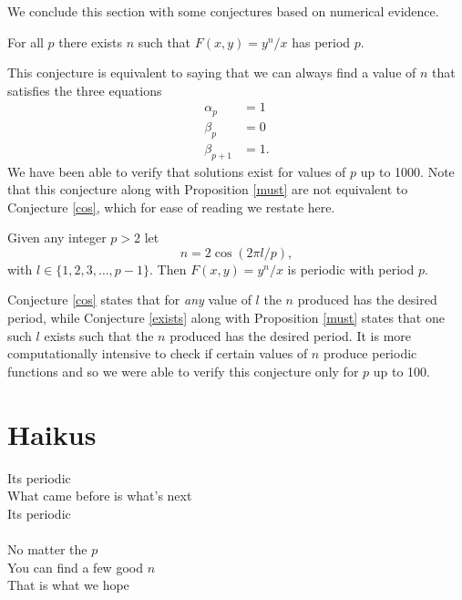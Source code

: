 \documentclass[12pt]{article}
\begin{document}
We conclude this section with some conjectures based on numerical evidence. 

\begin{conjecture}
\label{exists}
 For all $p$ there exists $n$ such that $F(x,y)=y^n/x$ has period $p$. 
\end{conjecture} 
This conjecture is equivalent to saying that we can always find a value of $n$ that satisfies the three equations 
\begin{align*}
\alpha_p &=1\\ 
\beta_p &=0\\
\beta_{p+1} &=1.
\end{align*}
We have been able to verify that solutions exist for values of $p$ up to 1000. Note that this conjecture along with Proposition \ref{must} are not equivalent to Conjecture \ref{cos}, which for ease of reading we restate here. 
\begin{conjecture}
Given any integer $p>2$ let 
\begin{equation*}
n = 2 \cos(2 \pi l/p),
\end{equation*}
with $l \in \{1,2,3, \ldots, p-1 \}$. Then $F(x,y) = y^n/x$ is periodic with period $p$.
\end{conjecture}
Conjecture \ref{cos} states that for \emph{any} value of $l$ the $n$ produced has the desired period, while Conjecture \ref{exists} along with Proposition \ref{must} states that one such $l$ exists such that the $n$ produced has the desired period. It is more computationally intensive to check if certain values of $n$ produce periodic functions and so we were able to verify this conjecture only for $p$ up to 100.

\section{Haikus} 
Its periodic  \\
What came before is what's next \\
Its periodic \\ \\
No matter the $p$ \\
You can find a few good $n$\\
That is what we hope \\
\end{document}
